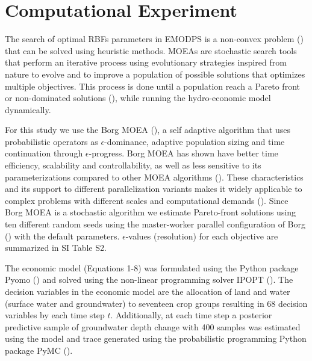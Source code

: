 \documentclass[11pt,a4paper]{article}
\begin{document}
\section{Computational Experiment}

The search of optimal RBFs parameters in EMODPS is a non-convex problem (\cite{giuliani_curses_2016}) that can be solved using heuristic methods. MOEAs are stochastic search tools that perform an iterative process using evolutionary strategies inspired from nature to evolve and to improve a population of possible solutions that optimizes multiple objectives. This process is done until a population reach a Pareto front or non-dominated solutions (\cite{coello_evolutionary_2007}), while running the hydro-economic model dynamically. 

For this study we use the Borg MOEA (\cite{hadka_borg_2013}), a self adaptive algorithm that uses probabilistic operators as $\epsilon$-dominance, adaptive population sizing and time continuation through $\epsilon$-progress. Borg MOEA has shown have better time efficiency, scalability and controllability, as well as less sensitive to its parameterizations compared to other MOEA algorithms (\cite{reed_evolutionary_2013}).  These characteristics and its support to different parallelization variants makes it widely applicable to complex problems with different scales and computational demands (\cite{hadka_large-scale_2015}). Since Borg MOEA is a stochastic algorithm we estimate Pareto-front solutions using ten different random seeds using the master-worker parallel configuration of Borg (\cite{hadka_large-scale_2015}) with the default parameters. $\epsilon$-values (resolution) for each objective are summarized in SI Table S2. 

The economic model (Equations 1-8) was formulated using the Python package Pyomo (\cite{hart_pyomo_2011}) and solved using the non-linear programming solver IPOPT (\cite{wachter_implementation_2006}). The decision variables in the economic model are the allocation of land and water (surface water and groundwater) to seventeen crop groups resulting in 68 decision variables by each time step $t$. Additionally, at each time step a posterior predictive sample of groundwater depth change with 400 samples was estimated using the model and trace generated using the probabilistic programming Python package PyMC  (\cite{salvatier_probabilistic_2016}).
\end{document}
